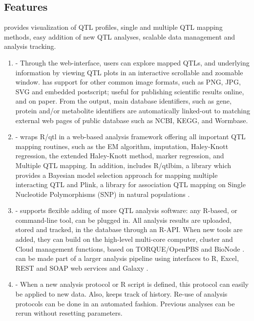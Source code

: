 \subsection{Features}
\xqtlwb provides visualization of QTL profiles, single and multiple QTL mapping methods, easy addition 
of new QTL analyses, scalable data management and analysis tracking.

\begin{enumerate}\itemsep1pt
\item {} - Through the web-interface, users can explore mapped QTLs, and 
underlying information by viewing QTL plots in an interactive scrollable and zoomable window. 
\xqtlwb has support for other common image formats, such as PNG, JPG, SVG and embedded postscript; 
useful for publishing scientific results online, and on paper. From the output, main database identifiers, 
such as gene, protein and/or metabolite identifiers are automatically linked-out to matching external 
web pages of public database such as NCBI, KEGG, and Wormbase.
\item {} - \xqtlwb wraps R/qtl \cite{Broman:2003, Arends:2010} in a 
web-based analysis framework offering all important QTL mapping routines, such as the EM algorithm, 
imputation, Haley-Knott regression, the extended Haley-Knott method, marker regression, and Multiple 
QTL mapping. In addition, \xqtlwb includes R/qtlbim, a library which provides a Bayesian model 
selection approach for mapping multiple interacting QTL \cite{Yandell:2007} and Plink, a library for 
association QTL mapping on Single Nucleotide Polymorphisms (SNP) in natural populations \cite{Purcell:2007}.
\item {} - \xqtlwb supports flexible adding of more QTL analysis software: 
any R-based, or command-line tool, can be plugged in. All analysis results are uploaded, stored and 
tracked, in the \xqtlwb database through an R-API. When new tools are added, they can build on the 
high-level multi-core computer, cluster and Cloud management functions, based on TORQUE/OpenPBS and 
BioNode \cite{Prins:2012}. \xqtlwb can be made part of a larger analysis pipeline using interfaces to R, 
Excel, REST and SOAP web services and Galaxy \cite{Goecks:2010}.
\item {} - When a new analysis protocol or R script is defined, this protocol 
can easily be applied to new data. Also, \xqtlwb keeps track of history. Re-use of analysis protocols 
can be done in an automated fashion. Previous analyses can be rerun without resetting parameters. 

\end{enumerate}
